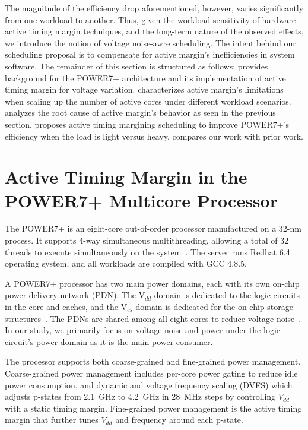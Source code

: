 The magnitude of the efficiency drop aforementioned, however, varies significantly from one workload to another. Thus, given the workload sensitivity of hardware active timing margin techniques, and the long-term nature of the observed effects, we introduce the notion of voltage noise-awre scheduling. The intent behind our scheduling proposal is to compensate for active margin's inefficiencies in system software. The remainder of this section is structured as follows:  provides background for the POWER7+ architecture and its implementation of active timing margin for voltage variation.  characterizes active margin's limitations when scaling up the number of active cores under different workload scenarios.  analyzes the root cause of active margin's behavior as seen in the previous section.  proposes active timing margining scheduling to improve POWER7+'s efficiency when the load is light versus heavy.  compares our work with prior work.

\section{Active Timing Margin in the POWER7+ Multicore Processor}
\label{sec:voltage:background}

The POWER7+ is an eight-core out-of-order processor manufactured on a 32-nm process. It supports 4-way simultaneous multithreading, allowing a total of 32 threads to execute simultaneously on the system~\cite{manousopoulos2012characterizing}. The server runs Redhat 6.4 operating system, and all workloads are compiled with GCC 4.8.5.

A POWER7+ processor has two main power domains, each with its own on-chip power delivery network (PDN). The V$_{dd}$ domain is dedicated to the logic circuits in the core and caches, and the V$_{cs}$ domain is dedicated for the on-chip storage structures~\cite{zyuban2013ibm,barth201045nm}. The PDNs are shared among all eight cores to reduce voltage noise~\cite{james2007comparison}. In our study, we primarily focus on voltage noise and power under the logic circuit's power domain as it is the main power consumer.

The processor supports both coarse-grained and fine-grained power management. Coarse-grained power management includes per-core power gating to reduce idle power consumption, and dynamic and voltage frequency scaling (DVFS) which adjusts p-states from 2.1~GHz to 4.2~GHz in 28~MHz steps by controlling $V_{dd}$ with a static timing margin. Fine-grained power management is the active timing margin that further tunes $V_{dd}$ and frequency around each p-state.

